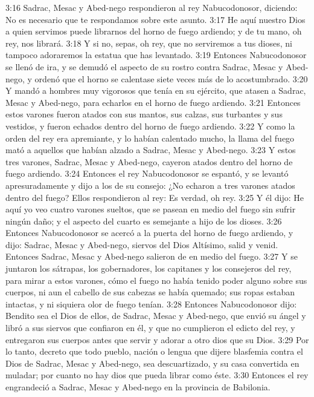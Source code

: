 3:16 Sadrac, Mesac y Abed-nego respondieron al rey Nabucodonosor, diciendo: No es necesario que te respondamos sobre este asunto. 
3:17 He aquí nuestro Dios a quien servimos puede librarnos del horno de fuego ardiendo; y de tu mano, oh rey, nos librará. 
3:18 Y si no, sepas, oh rey, que no serviremos a tus dioses, ni tampoco adoraremos la estatua que has levantado. 
3:19 Entonces Nabucodonosor se llenó de ira, y se demudó el aspecto de su rostro contra Sadrac, Mesac y Abed-nego, y ordenó que el horno se calentase siete veces más de lo acostumbrado. 
3:20 Y mandó a hombres muy vigorosos que tenía en su ejército, que atasen a Sadrac, Mesac y Abed-nego, para echarlos en el horno de fuego ardiendo. 
3:21 Entonces estos varones fueron atados con sus mantos, sus calzas, sus turbantes y sus vestidos, y fueron echados dentro del horno de fuego ardiendo. 
3:22 Y como la orden del rey era apremiante, y lo habían calentado mucho, la llama del fuego mató a aquellos que habían alzado a Sadrac, Mesac y Abed-nego. 
3:23 Y estos tres varones, Sadrac, Mesac y Abed-nego, cayeron atados dentro del horno de fuego ardiendo. 
3:24 Entonces el rey Nabucodonosor se espantó, y se levantó apresuradamente y dijo a los de su consejo: ¿No echaron a tres varones atados dentro del fuego? Ellos respondieron al rey: Es verdad, oh rey. 
3:25 Y él dijo: He aquí yo veo cuatro varones sueltos, que se pasean en medio del fuego sin sufrir ningún daño; y el aspecto del cuarto es semejante a hijo de los dioses. 
3:26 Entonces Nabucodonosor se acercó a la puerta del horno de fuego ardiendo, y dijo: Sadrac, Mesac y Abed-nego, siervos del Dios Altísimo, salid y venid. Entonces Sadrac, Mesac y Abed-nego salieron de en medio del fuego. 
3:27 Y se juntaron los sátrapas, los gobernadores, los capitanes y los consejeros del rey, para mirar a estos varones, cómo el fuego no había tenido poder alguno sobre sus cuerpos, ni aun el cabello de sus cabezas se había quemado; sus ropas estaban intactas, y ni siquiera olor de fuego tenían. 
3:28 Entonces Nabucodonosor dijo: Bendito sea el Dios de ellos, de Sadrac, Mesac y Abed-nego, que envió su ángel y libró a sus siervos que confiaron en él, y que no cumplieron el edicto del rey, y entregaron sus cuerpos antes que servir y adorar a otro dios que su Dios. 
3:29 Por lo tanto, decreto que todo pueblo, nación o lengua que dijere blasfemia contra el Dios de Sadrac, Mesac y Abed-nego, sea descuartizado, y su casa convertida en muladar; por cuanto no hay dios que pueda librar como éste. 
3:30 Entonces el rey engrandeció a Sadrac, Mesac y Abed-nego en la provincia de Babilonia. 
